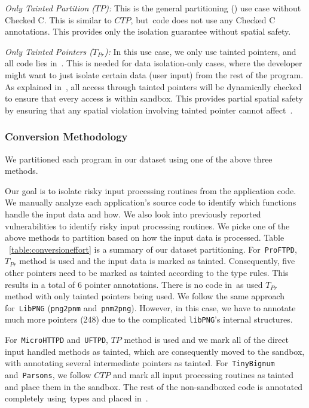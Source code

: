\noindent\emph{Only Tainted Partition ($TP$):}
This is the general partitioning () use case without Checked C.
This is similar to $CTP$, but~\cregion code does not use any Checked C annotations.
This provides only the isolation guarantee without spatial safety.


\noindent\emph{Only Tainted Pointers ($T_{Pr}$):}
In this use case, we only use tainted pointers, and all code lies in~\cregion.
This is needed for data isolation-only cases, where the developer might want to just isolate certain data (\eg user input) from the rest of the program.
As explained in~, all access through tainted pointers will be dynamically checked to ensure that every access is within sandbox.
This provides partial spatial safety by ensuring that any spatial violation involving tainted pointer cannot affect~\cregion.


% 
\subsubsection{Conversion Methodology}
We partitioned each program in our dataset using one of the above three methods.

Our goal is to isolate risky input processing routines from the application code.
We manually analyze each application's source code to identify which functions handle the input data and how.
We also look into previously reported vulnerabilities to identify risky input processing routines.
We picke one of the above methods to partition based on how the input data is processed.
Table ~\ref{table:conversioneffort} is a summary of our dataset partitioning.
For~\texttt{ProFTPD}, $T_{Pr}$ method is used and the input data is marked as tainted.
Consequently, five other pointers need to be marked as tainted according to the type rules. This results in a total of 6 pointer annotations. There is no code in~\ucregion as used $T_{Pr}$ method with only tainted pointers being used.
We follow the same approach for~\texttt{LibPNG} (\texttt{png2pnm} and~\texttt{pnm2png}). However, in this case, we have to annotate much more pointers (248) due to the complicated \texttt{libPNG}'s internal structures.

For~\texttt{MicroHTTPD} and~\texttt{UFTPD}, $TP$ method is used and we mark all of the direct input handled methods as tainted, which are consequently moved to the sandbox, with annotating several intermediate pointers as tainted.
For~\texttt{TinyBignum} and~\texttt{Parsons},
we follow $CTP$ and mark all input processing routines as tainted and place them in the sandbox.
The rest of the non-sandboxed code is annotated completely using~\checkedc types and placed in~\cregion.

